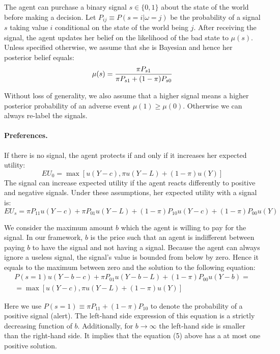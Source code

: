 \documentclass[12pt,a4paper]{article}
\begin{document}
The agent can purchase a binary signal $s\in\{0,1\}$ about the state of the world before making a decision. Let $P_{ij}\equiv P(s=i|\omega=j)$ be the probability of a signal $s$ taking value $i$ conditional on the state of the world being $j$.  After receiving the signal, the agent updates her belief on the likelihood of the bad state to $\mu(s)$. Unless specified otherwise, we assume that she is Bayesian and hence her posterior belief equals:
\begin{equation}
\mu(s)= {\pi P_{s1} \over \pi P_{s1}+(1-\pi)P_{s0}}
\end{equation}

Without loss of generality, we also assume that a higher signal means a higher posterior probability of an adverse event $\mu(1)\geq\mu(0)$. Otherwise we can always re-label the signals.

\vspace{10pt}
\paragraph{Preferences.} If there is no signal, the agent protects if and only if it increases her expected utility:
\begin{equation}
EU_0=\max[u(Y-c),\pi u(Y-L)+(1-\pi) u(Y)]
\end{equation}
The signal can increase expected utility if the agent reacts differently to positive and negative signals. Under these assumptions, her expected utility with a signal is:
\begin{equation}
EU_s=\pi P_{11}u(Y-c)+\pi P_{01}u(Y-L)+(1-\pi)P_{10}u(Y-c)+(1-\pi)P_{00}u(Y)
\end{equation}

We consider the maximum amount $b$ which the agent is willing to pay for the signal. In our framework, $b$ is the price such that an agent is indifferent between paying $b$ to have the signal and not having a signal. Because the agent can always ignore a useless signal, the signal's value is bounded from below by zero. Hence it equals to the maximum between zero and the solution to the following equation:
\begin{equation}
\begin{split}
P(s=1)u(Y-b-c)+\pi P_{01}u(Y-b-L)+(1-\pi)P_{00}u(Y-b)=\\=\max[u(Y-c),\pi u(Y-L)+(1-\pi) u(Y)] 
\end{split}
\end{equation}

Here we use $P(s=1)\equiv \pi P_{11}+(1-\pi)P_{10}$ to denote the probability of a positive signal (alert). The left-hand side expression of this equation is a strictly decreasing function of $b$. Additionally, for $b\rightarrow \infty$ the left-hand side is smaller than the right-hand side. It implies that the equation (5) above has a at most one positive solution.
\end{document}

